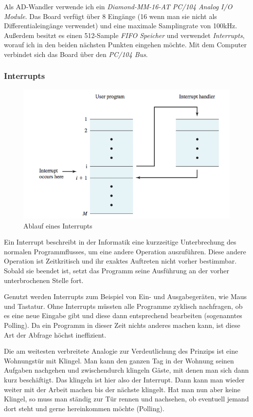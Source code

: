 \documentclass[12pt,a4paper]{scrartcl}
\begin{document}
Als AD-Wandler verwende ich ein \textit{Diamond-MM-16-AT PC/104 Analog I/O Module}. Das Board verfügt über 8 Eingänge (16 wenn man sie nicht als Differentialeingänge verwendet) und eine maximale Samplingrate von 100kHz. Außerdem besitzt es einen 512-Sample \textit{FIFO Speicher} und verwendet \textit{Interrupts}, worauf ich in den beiden nächsten Punkten eingehen möchte.
Mit dem Computer verbindet sich das Board über den \textit{PC/104 Bus}.


\subsubsection{Interrupts}

\begin{figure}[H]
\centering
\includegraphics[scale=1.4]{interrupt.png}
\caption{Ablauf eines Interrupts \citep{Stallings:2000uq}}
\label{interrupt}
\end{figure}

Ein Interrupt beschreibt in der Informatik eine kurzzeitige Unterbrechung des normalen Programmflusses, um eine andere Operation auszuführen. Diese andere Operation ist Zeitkritisch und ihr exaktes Auftreten nicht vorher bestimmbar. Sobald sie beendet ist, setzt das Programm seine Ausführung an der vorher unterbrochenen Stelle fort.

Genutzt werden Interrupts zum Beispiel von Ein- und Ausgabegeräten, wie Maus und Tastatur. Ohne Interrupts müssten alle Programme zyklisch nachfragen, ob es eine neue Eingabe gibt und diese dann entsprechend bearbeiten (sogenanntes Polling). Da ein Programm in dieser Zeit nichts anderes machen kann, ist diese Art der Abfrage höchst ineffizient.

Die am weitesten verbreitete Analogie zur Verdeutlichung des Prinzips ist eine Wohnungstür mit Klingel. Man kann den ganzen Tag in der Wohnung seinen Aufgaben nachgehen und zwischendurch klingeln Gäste, mit denen man sich dann kurz beschäftigt. Das klingeln ist hier also der Interrupt. Dann kann man wieder weiter mit der Arbeit machen bis der nächste klingelt. Hat man nun aber keine Klingel, so muss man ständig zur Tür rennen und nachsehen, ob eventuell jemand dort steht und gerne hereinkommen möchte (Polling).
\end{document}
